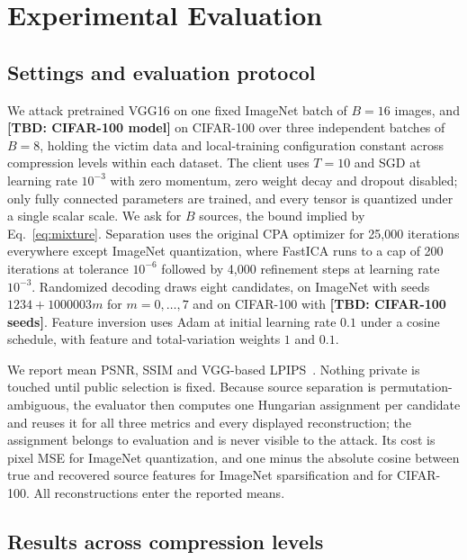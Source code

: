 \documentclass{article}
\newcommand{\tbd}[1]{\textbf{[TBD: #1]}}
\begin{document}
\section{Experimental Evaluation}
\label{sec:experiments}
\subsection{Settings and evaluation protocol}
\label{sec:setup}
We attack pretrained VGG16 on one fixed ImageNet batch of $B=16$ images, and
\tbd{CIFAR-100 model} on CIFAR-100 over three independent batches of $B=8$,
holding the victim data and local-training configuration constant across
compression levels within each dataset. The client uses $T=10$ and SGD at
learning rate $10^{-3}$ with zero momentum, zero weight decay and dropout
disabled; only fully connected parameters are trained, and every tensor is
quantized under a single scalar scale. We ask for $B$ sources, the bound
implied by Eq.~\eqref{eq:mixture}. Separation uses the original CPA optimizer
for 25,000 iterations everywhere except ImageNet quantization, where FastICA
runs to a cap of 200 iterations at tolerance $10^{-6}$ followed by 4,000
refinement steps at learning rate $10^{-3}$. Randomized decoding draws eight
candidates, on ImageNet with seeds $1234+1000003m$ for $m=0,\ldots,7$ and on
CIFAR-100 with \tbd{CIFAR-100 seeds}. Feature inversion uses Adam at initial
learning rate $0.1$ under a cosine schedule, with feature and total-variation
weights $1$ and $0.1$.

We report mean PSNR, SSIM and VGG-based LPIPS~\cite{zhang2018lpips}. Nothing
private is touched until public selection is fixed. Because source separation
is permutation-ambiguous, the evaluator then computes one Hungarian assignment
per candidate and reuses it for all three metrics and every displayed
reconstruction; the assignment belongs to evaluation and is never visible to
the attack. Its cost is pixel MSE for ImageNet quantization, and one minus the
absolute cosine between true and recovered source features for ImageNet
sparsification and for CIFAR-100. All reconstructions enter the reported
means.

\subsection{Results across compression levels}
\label{sec:bits}
\end{document}
